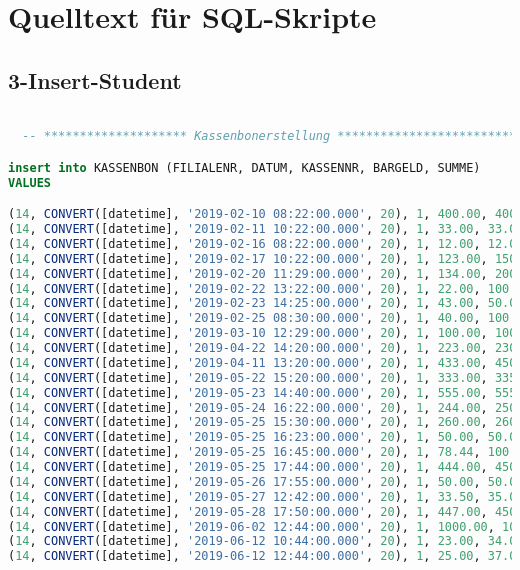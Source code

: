 \section{Quelltext für SQL-Skripte}

\subsection{3-Insert-Student}

\begin{lstlisting}[language=SQL]

  -- ******************** Kassenbonerstellung *************************** --

insert into KASSENBON (FILIALENR, DATUM, KASSENNR, BARGELD, SUMME)
VALUES

(14, CONVERT([datetime], '2019-02-10 08:22:00.000', 20), 1, 400.00, 400.00),
(14, CONVERT([datetime], '2019-02-11 10:22:00.000', 20), 1, 33.00, 33.00),
(14, CONVERT([datetime], '2019-02-16 08:22:00.000', 20), 1, 12.00, 12.00),
(14, CONVERT([datetime], '2019-02-17 10:22:00.000', 20), 1, 123.00, 150.00),
(14, CONVERT([datetime], '2019-02-20 11:29:00.000', 20), 1, 134.00, 200.00),
(14, CONVERT([datetime], '2019-02-22 13:22:00.000', 20), 1, 22.00, 100.00),
(14, CONVERT([datetime], '2019-02-23 14:25:00.000', 20), 1, 43.00, 50.00),
(14, CONVERT([datetime], '2019-02-25 08:30:00.000', 20), 1, 40.00, 100.00),
(14, CONVERT([datetime], '2019-03-10 12:29:00.000', 20), 1, 100.00, 100.00),
(14, CONVERT([datetime], '2019-04-22 14:20:00.000', 20), 1, 223.00, 230.00),
(14, CONVERT([datetime], '2019-04-11 13:20:00.000', 20), 1, 433.00, 450.00),
(14, CONVERT([datetime], '2019-05-22 15:20:00.000', 20), 1, 333.00, 335.00),
(14, CONVERT([datetime], '2019-05-23 14:40:00.000', 20), 1, 555.00, 555.00),
(14, CONVERT([datetime], '2019-05-24 16:22:00.000', 20), 1, 244.00, 250.00),
(14, CONVERT([datetime], '2019-05-25 15:30:00.000', 20), 1, 260.00, 260.00),
(14, CONVERT([datetime], '2019-05-25 16:23:00.000', 20), 1, 50.00, 50.00),
(14, CONVERT([datetime], '2019-05-25 16:45:00.000', 20), 1, 78.44, 100.00),
(14, CONVERT([datetime], '2019-05-25 17:44:00.000', 20), 1, 444.00, 450.00),
(14, CONVERT([datetime], '2019-05-26 17:55:00.000', 20), 1, 50.00, 50.00),
(14, CONVERT([datetime], '2019-05-27 12:42:00.000', 20), 1, 33.50, 35.00),
(14, CONVERT([datetime], '2019-05-28 17:50:00.000', 20), 1, 447.00, 450.00),
(14, CONVERT([datetime], '2019-06-02 12:44:00.000', 20), 1, 1000.00, 1000.00),
(14, CONVERT([datetime], '2019-06-12 10:44:00.000', 20), 1, 23.00, 34.00),
(14, CONVERT([datetime], '2019-06-12 12:44:00.000', 20), 1, 25.00, 37.00),

\end{lstlisting}
